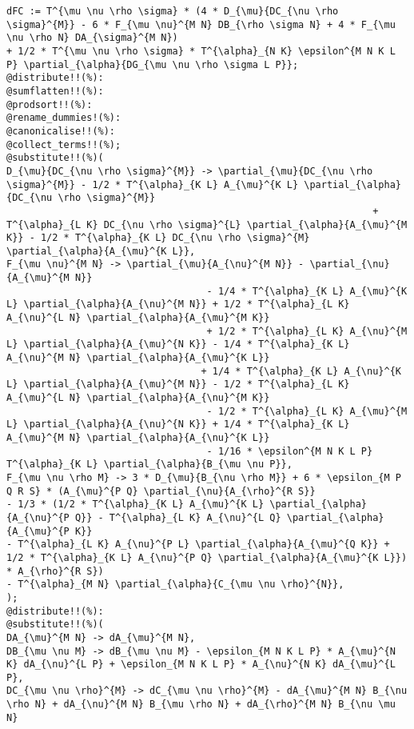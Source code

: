 \documentclass[11pt]{article}
\begin{document}
{\color[named]{Blue}\begin{verbatim}
dFC := T^{\mu \nu \rho \sigma} * (4 * D_{\mu}{DC_{\nu \rho \sigma}^{M}} - 6 * F_{\mu \nu}^{M N} DB_{\rho \sigma N} + 4 * F_{\mu \nu \rho N} DA_{\sigma}^{M N})
+ 1/2 * T^{\mu \nu \rho \sigma} * T^{\alpha}_{N K} \epsilon^{M N K L P} \partial_{\alpha}{DG_{\mu \nu \rho \sigma L P}};
@distribute!!(%):
@sumflatten!!(%):
@prodsort!!(%):
@rename_dummies!(%):
@canonicalise!!(%):
@collect_terms!!(%);
@substitute!!(%)(
D_{\mu}{DC_{\nu \rho \sigma}^{M}} -> \partial_{\mu}{DC_{\nu \rho \sigma}^{M}} - 1/2 * T^{\alpha}_{K L} A_{\mu}^{K L} \partial_{\alpha}{DC_{\nu \rho \sigma}^{M}}
                                                                + T^{\alpha}_{L K} DC_{\nu \rho \sigma}^{L} \partial_{\alpha}{A_{\mu}^{M K}} - 1/2 * T^{\alpha}_{K L} DC_{\nu \rho \sigma}^{M} \partial_{\alpha}{A_{\mu}^{K L}},
F_{\mu \nu}^{M N} -> \partial_{\mu}{A_{\nu}^{M N}} - \partial_{\nu}{A_{\mu}^{M N}}
                                   - 1/4 * T^{\alpha}_{K L} A_{\mu}^{K L} \partial_{\alpha}{A_{\nu}^{M N}} + 1/2 * T^{\alpha}_{L K} A_{\nu}^{L N} \partial_{\alpha}{A_{\mu}^{M K}}
                                   + 1/2 * T^{\alpha}_{L K} A_{\nu}^{M L} \partial_{\alpha}{A_{\mu}^{N K}} - 1/4 * T^{\alpha}_{K L} A_{\nu}^{M N} \partial_{\alpha}{A_{\mu}^{K L}}
                                  + 1/4 * T^{\alpha}_{K L} A_{\nu}^{K L} \partial_{\alpha}{A_{\mu}^{M N}} - 1/2 * T^{\alpha}_{L K} A_{\mu}^{L N} \partial_{\alpha}{A_{\nu}^{M K}}
                                   - 1/2 * T^{\alpha}_{L K} A_{\mu}^{M L} \partial_{\alpha}{A_{\nu}^{N K}} + 1/4 * T^{\alpha}_{K L} A_{\mu}^{M N} \partial_{\alpha}{A_{\nu}^{K L}}
                                   - 1/16 * \epsilon^{M N K L P} T^{\alpha}_{K L} \partial_{\alpha}{B_{\mu \nu P}},
F_{\mu \nu \rho M} -> 3 * D_{\mu}{B_{\nu \rho M}} + 6 * \epsilon_{M P Q R S} * (A_{\mu}^{P Q} \partial_{\nu}{A_{\rho}^{R S}} 
- 1/3 * (1/2 * T^{\alpha}_{K L} A_{\mu}^{K L} \partial_{\alpha}{A_{\nu}^{P Q}} - T^{\alpha}_{L K} A_{\nu}^{L Q} \partial_{\alpha}{A_{\mu}^{P K}}
- T^{\alpha}_{L K} A_{\nu}^{P L} \partial_{\alpha}{A_{\mu}^{Q K}} + 1/2 * T^{\alpha}_{K L} A_{\nu}^{P Q} \partial_{\alpha}{A_{\mu}^{K L}}) * A_{\rho}^{R S})
- T^{\alpha}_{M N} \partial_{\alpha}{C_{\mu \nu \rho}^{N}},
);
@distribute!!(%):
@substitute!!(%)(
DA_{\mu}^{M N} -> dA_{\mu}^{M N},
DB_{\mu \nu M} -> dB_{\mu \nu M} - \epsilon_{M N K L P} * A_{\mu}^{N K} dA_{\nu}^{L P} + \epsilon_{M N K L P} * A_{\nu}^{N K} dA_{\mu}^{L P},
DC_{\mu \nu \rho}^{M} -> dC_{\mu \nu \rho}^{M} - dA_{\mu}^{M N} B_{\nu \rho N} + dA_{\nu}^{M N} B_{\mu \rho N} + dA_{\rho}^{M N} B_{\nu \mu N}

\end{verbatim}}
\end{document}

